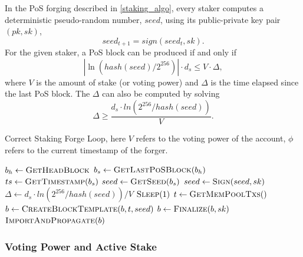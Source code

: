 \documentclass[a4paper]{article}
\begin{document}
In the PoS forging described in \cref{staking_algo}, every staker computes a deterministic pseudo-random number, $seed$, using its public-private key pair $(pk, sk)$,
\begin{equation}
seed_{t + 1} = sign(seed_t, sk).
\end{equation}
For the given staker, a PoS block can be produced if and only if
\begin{equation}
|\ln({hash(seed)}/{2^{256}})| \cdot d_s \leq V \cdot \Delta,
\end{equation}
where $V$ is the amount of stake (or voting power) and $\Delta$ is the time elapsed since the last PoS block. The $\Delta$ can also be computed by solving
\begin{equation}
\Delta \geq \frac{d_s \cdot ln({2^{256}}/{hash(seed)})}{V}.
\end{equation}

\begin{algorithm}
    \caption{Correct Staking Forge Loop, here $V$ refers to the voting power of the account, $\phi$ refers to the current timestamp of the forger.}
    \label{staking_algo}
    \begin{algorithmic}[1]
        \State $b_h  \gets \Call{GetHeadBlock}{}$
        \State $b_s  \gets \Call{GetLastPoSBlock}{b_h}$
        \State $ts   \gets \Call{GetTimestamp}{b_s}$
        \State $seed \gets \Call{GetSeed}{b_s}$
        \State $seed \gets \Call{Sign}{seed, sk}$
        \State $\Delta \gets d_s \cdot ln(2^{256} / hash(seed)) / V$
        \Do
            \State $\Call{Sleep}{1}$
        \State $t \gets \Call{GetMemPoolTxs}$
        \State $b \gets \Call{CreateBlockTemplate}{b, t, seed}$
        \State $b \gets \Call{Finalize}{b, sk}$
        \State $\Call{ImportAndPropagate}{b}$
        \EndProcedure
    \end{algorithmic}
\end{algorithm}

\subsubsection{Voting Power and Active Stake}
\end{document}
